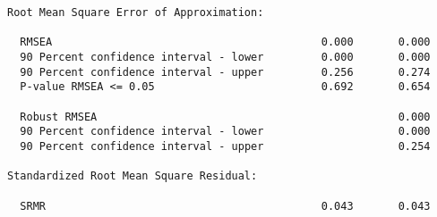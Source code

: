 \begin{verbatim}
Root Mean Square Error of Approximation:

  RMSEA                                          0.000       0.000
  90 Percent confidence interval - lower         0.000       0.000
  90 Percent confidence interval - upper         0.256       0.274
  P-value RMSEA <= 0.05                          0.692       0.654
                                                                  
  Robust RMSEA                                               0.000
  90 Percent confidence interval - lower                     0.000
  90 Percent confidence interval - upper                     0.254

Standardized Root Mean Square Residual:

  SRMR                                           0.043       0.043
\end{verbatim}
